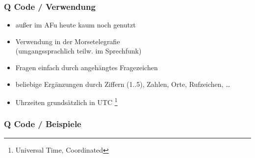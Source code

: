 \begin{frame}
  \frametitle{Q Code / Verwendung}

  \begin{itemize}
    \item außer im AFu heute kaum noch genutzt
    \item Verwendung in der Morsetelegrafie \\
      (umgangssprachlich teilw. im Sprechfunk)
    \item Fragen einfach durch angehängtes Fragezeichen
    \item beliebige Ergänzungen durch Ziffern (1..5), Zahlen, Orte, Rufzeichen, \ldots
    \item Uhrzeiten grundsätzlich in UTC
      \footnote{\tiny Universal Time, Coordinated}
  \end{itemize}

\end{frame}

\begin{frame}
  \frametitle{Q Code / Beispiele}





\end{frame}



